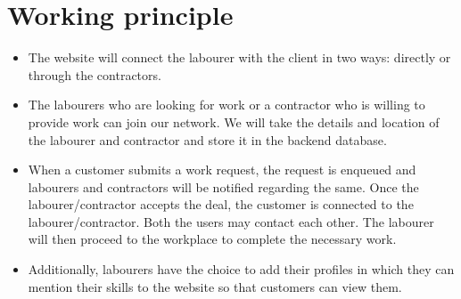 \documentclass[12pt]{article}
\begin{document}
\section*{Working principle}
\begin{itemize}
\item The website will connect the labourer with the client in two ways: directly or through the contractors.
\item The labourers who are looking for work or a contractor who is willing to provide work can join our network.
We will take the details and location of the labourer and contractor and store it in the backend database.
\item When a customer submits a work request, the request is enqueued and labourers and contractors will be notified regarding the same. Once the labourer/contractor accepts the deal, the 
customer is  connected to  the labourer/contractor. Both the users may contact each other. The labourer will then proceed to the workplace to complete the necessary work.
\item Additionally, labourers have the choice to add their profiles in which they can mention their skills to the website so that customers can view them. 

\end{itemize}

\pagebreak
\end{document}

